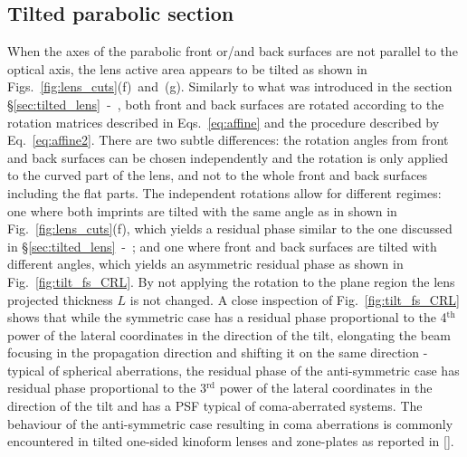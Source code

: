 \begin{refsection}
\subsection{Tilted parabolic section}

When the axes of the parabolic front or/and back surfaces are not parallel to the optical axis, the lens active area appears to be tilted as shown in Figs.~\ref{fig:lens_cuts}(f)~and~(g). Similarly to what was introduced in the section \S\ref{sec:tilted_lens}~-~\textit{}, both front and back surfaces are rotated according to the rotation matrices described in Eqs.~\ref{eq:affine} and the procedure described by Eq.~\ref{eq:affine2}. There are two subtle differences: the rotation angles from front and back surfaces can be chosen independently and the rotation is only applied to the curved part of the lens, and not to the whole front and back surfaces including the flat parts. The independent rotations allow for different regimes: one where both imprints are tilted with the same angle as in shown in Fig.~\ref{fig:lens_cuts}(f), which yields a residual phase similar to the one discussed in \S\ref{sec:tilted_lens}~-~\textit{}; and one where front and back surfaces are tilted with different angles, which yields an asymmetric residual phase as shown in Fig.~\ref{fig:tilt_fs_CRL}. By not applying the rotation to the plane region the lens projected thickness $L$ is not changed. A close inspection of Fig.~\ref{fig:tilt_fs_CRL} shows that while the symmetric case has a residual phase proportional to the 4$^{\text{th}}$ power of the lateral coordinates in the direction of the tilt, elongating the beam focusing in the propagation direction and shifting it on the same direction - typical of spherical aberrations, the residual phase of the anti-symmetric case has residual phase proportional to the 3$^{\text{rd}}$ power of the lateral coordinates in the direction of the tilt and has a PSF typical of coma-aberrated systems. The behaviour of the anti-symmetric case resulting in coma aberrations is commonly encountered in tilted one-sided kinoform lenses and zone-plates as reported in [\cite{Guizar-Sicairos2011,Ali2020}]. 


\end{refsection}

